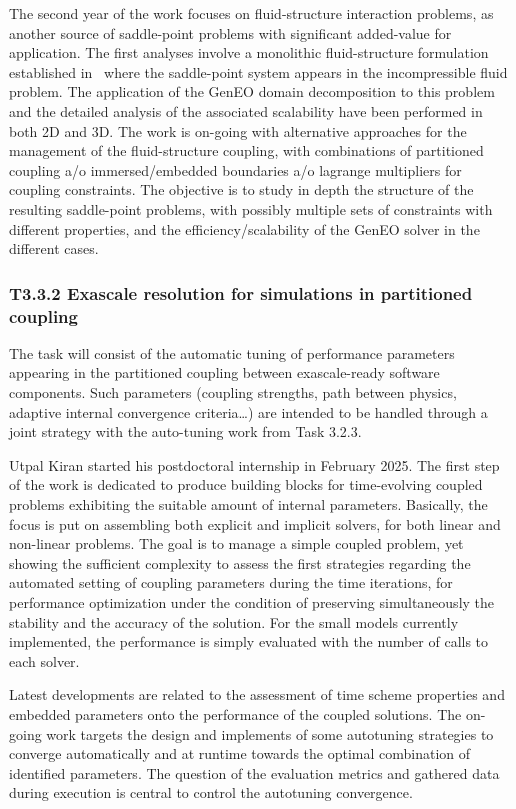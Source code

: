   The second year of the work focuses on fluid-structure interaction problems, as another source of saddle-point problems with significant added-value for application. The first analyses involve a monolithic fluid-structure formulation established in~\cite{hecht_energy_2017} where the saddle-point system appears in the incompressible fluid problem. The application of the GenEO domain decomposition to this problem and the detailed analysis of the associated scalability have been performed in both 2D and 3D. The work is on-going with alternative approaches for the management of the fluid-structure coupling, with combinations of partitioned coupling a/o immersed/embedded boundaries a/o lagrange multipliers for coupling constraints. The objective is to study in depth the structure of the resulting saddle-point problems, with possibly multiple sets of constraints with different properties, and the efficiency/scalability of the GenEO solver in the different cases.


\subsubsection{ 
T3.3.2 Exascale resolution for simulations in partitioned coupling
}
\label{sec:wp3:T332}
 The task will consist of the automatic tuning of performance parameters appearing in the partitioned coupling between exascale-ready software components. Such parameters (coupling strengths, path between physics, adaptive internal convergence criteria…) are intended to be handled through a joint strategy with the auto-tuning work from Task 3.2.3. 

Utpal Kiran started his postdoctoral internship in February 2025. The first step of the work is dedicated to produce building blocks for time-evolving coupled problems exhibiting the suitable amount of internal parameters. Basically, the focus is put on assembling both explicit and implicit solvers, for both linear and non-linear problems. The goal is to manage a simple coupled problem, yet showing the sufficient complexity to assess the first strategies regarding the automated setting of coupling parameters during the time iterations, for performance optimization under the condition of preserving simultaneously the stability and the accuracy of the solution. For the small models currently implemented, the performance is simply evaluated with the number of calls to each solver. 

Latest developments are related to the assessment of time scheme properties and embedded parameters onto the performance of the coupled solutions. The on-going work targets the design and implements of some autotuning strategies to converge automatically and at runtime towards the optimal combination of identified parameters. The question of the evaluation metrics and gathered data during execution is central to control the autotuning convergence.


